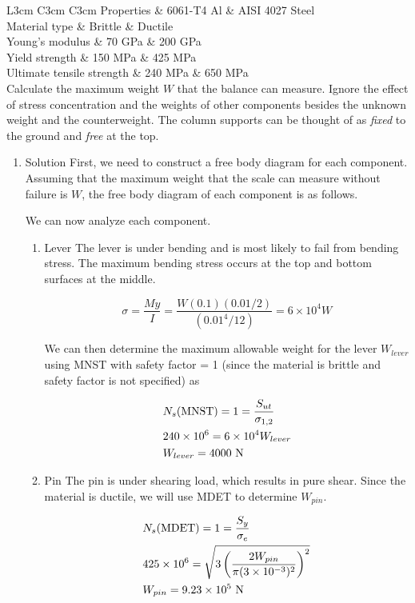 \documentclass[a4paper,openany,nobib]{tufte-book}
\begin{document}
{{ L3cm C3cm C3cm Properties \& 6061-T4 Al \& AISI 4027 Steel\\
Material type \& Brittle \& Ductile\\
Young's modulus \& 70 GPa \& 200 GPa\\
Yield strength \& 150 MPa \& 425 MPa\\
Ultimate tensile strength \& 240 MPa \& 650 MPa\\

Calculate the maximum weight \(W\) that the balance can measure. Ignore
the effect of stress concentration and the weights of other components
besides the unknown weight and the counterweight. The column supports
can be thought of as \emph{fixed} to the ground and \emph{free} at the top.

\begin{enumerate}
\item Solution
\label{solution}
First, we need to construct a free body diagram for each component.
Assuming that the maximum weight that the scale can measure without
failure is \(W\), the free body diagram of each component is as follows.


We can now analyze each component.

\begin{enumerate}
\item Lever
\label{lever}
The lever is under bending and is most likely to fail from bending
stress. The maximum bending stress occurs at the top and bottom surfaces
at the middle.

$$\sigma  = \frac{My}{I} = \frac{W(0.1)(0.01/2)}{(0.01^4/12)} = 6 \times
  10^4W$$

We can then determine the maximum allowable weight for the lever
\(W_{lever}\) using MNST with safety factor = 1 (since the material is
brittle and safety factor is not specified) as

$$\begin{gathered}
  N_s\text{(MNST)} = 1 = \frac{S_{ut}}{\sigma _{1,2}} \hfill \\
  240 \times {10^6} = 6 \times 10^4W_{lever} \hfill \\
  W_{lever} = 4000\text{ N} \hfill \\ 
\end{gathered}$$

\item Pin
\label{pin}
The pin is under shearing load, which results in pure shear. Since the
material is ductile, we will use MDET to determine \(W_{pin}\).

$$\begin{gathered}
  N_s\text{(MDET)} = 1 = \frac{S_y}{\sigma_e} \hfill \\
  425 \times 10^6 = \sqrt {3\left( \frac{2W_{pin}}{\pi (3 \times 10^{-3})^2} \right)^2}  \hfill \\
  W_{pin} = 9.23 \times 10^5\text{ N} \hfill \\ 
\end{gathered}$$


\end{enumerate}
\end{enumerate}}}
\end{document}
